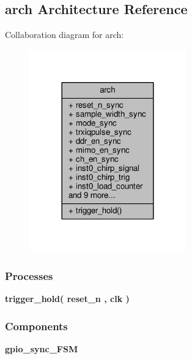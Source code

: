 \subsection{arch Architecture Reference}
\label{classgpio__chirp__sync__top_1_1arch}


Collaboration diagram for arch\+:\nopagebreak
\begin{figure}[H]
\begin{center}
\leavevmode
\includegraphics[width=192pt]{d0/d17/classgpio__chirp__sync__top_1_1arch__coll__graph}
\end{center}
\end{figure}
\subsubsection*{Processes}
 \begin{DoxyCompactItemize}
\item 
{\bf trigger\+\_\+hold}{\bfseries  ( {\bfseries {\bfseries {\bf reset\+\_\+n}} \textcolor{vhdlchar}{ }} , {\bfseries {\bfseries {\bf clk}} \textcolor{vhdlchar}{ }} )}
\end{DoxyCompactItemize}
\subsubsection*{Components}
 \begin{DoxyCompactItemize}
\item 
{\bf gpio\+\_\+sync\+\_\+\+F\+SM}  {\bfseries }  
\end{DoxyCompactItemize}
